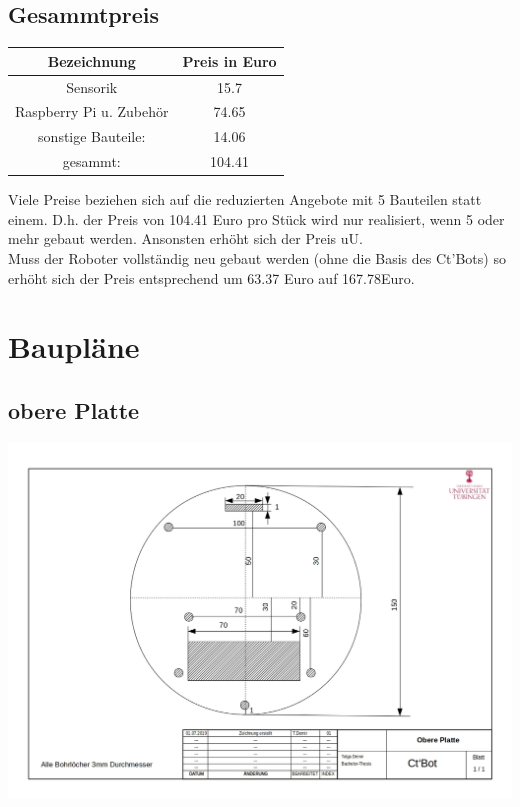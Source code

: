 \documentclass[a4paper,cleardoubleempty,BCOR1cm]{book}
\begin{document}
\section{Gesammtpreis}
\begin{center}
	\begin{tabular}{|c|c|}
		\hline
		Bezeichnung				& Preis	in Euro	\\
		\hline
		Sensorik				& 15.7\\
		Raspberry Pi u. Zubehör	& 74.65\\
		sonstige Bauteile:		& 14.06\\
		\hline
		gesammt:				& 104.41\\
		\hline
	\end{tabular}
\end{center}
Viele Preise beziehen sich auf die reduzierten Angebote mit 5 Bauteilen statt einem. D.h. der Preis von 104.41 Euro pro Stück wird nur realisiert, wenn 5 oder mehr gebaut werden. Ansonsten erhöht sich der Preis uU. \\
Muss der Roboter vollständig neu gebaut werden (ohne die Basis des Ct'Bots) so erhöht sich der Preis entsprechend um 63.37 Euro auf 167.78Euro. 

\chapter{Baupläne}
\section{obere Platte}
\includegraphics[angle=90,origin=c, scale= 0.5]{images/Zeichnung_obere_Platte.jpg}
\end{document}
